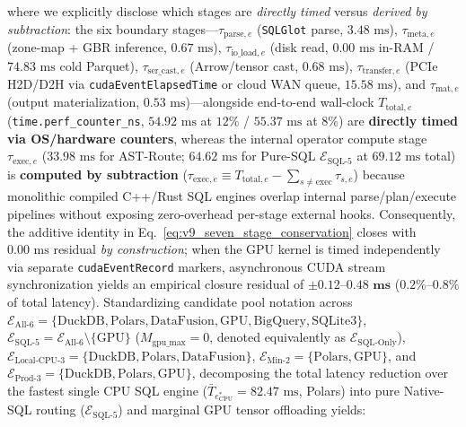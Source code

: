 \documentclass[10pt,a4paper]{article}
\begin{document}
\begin{enumerate}[leftmargin=1.5em,itemsep=0.8pt]
    where we explicitly disclose which stages are \emph{directly timed} versus \emph{derived by subtraction}: the six boundary stages---$\tau_{\text{parse},e}$ (\texttt{SQLGlot} parse, $3.48\text{ ms}$), $\tau_{\text{meta},e}$ (zone-map + GBR inference, $0.67\text{ ms}$), $\tau_{\text{io\_load},e}$ (disk read, $0.00\text{ ms}$ in-RAM / $74.83\text{ ms}$ cold Parquet), $\tau_{\text{ser\_cast},e}$ (Arrow/tensor cast, $0.68\text{ ms}$), $\tau_{\text{transfer},e}$ (PCIe H2D/D2H via \texttt{cudaEventElapsedTime} or cloud WAN queue, $15.58\text{ ms}$), and $\tau_{\text{mat},e}$ (output materialization, $0.53\text{ ms}$)---alongside end-to-end wall-clock $T_{\text{total},e}$ (\texttt{time.perf\_\allowbreak{}counter\_\allowbreak{}ns}, $54.92\text{ ms}$ at $12\%$ / $55.37\text{ ms}$ at $8\%$) are \textbf{directly timed via OS/hardware counters}, whereas the internal operator compute stage $\tau_{\text{exec},e}$ ($33.98\text{ ms}$ for AST-Route; $64.62\text{ ms}$ for Pure-SQL $\mathcal{E}_{\text{SQL-5}}$ at $69.12\text{ ms}$ total) is \textbf{computed by subtraction} ($\tau_{\text{exec},e} \equiv T_{\text{total},e} - \sum_{s\neq\text{exec}}\tau_{s,e}$) because monolithic compiled C++/Rust SQL engines overlap internal parse/plan/execute pipelines without exposing zero-overhead per-stage external hooks. Consequently, the additive identity in Eq.~\eqref{eq:v9_seven_stage_conservation} closes with $0.00\text{ ms}$ residual \emph{by construction}; when the GPU kernel is timed independently via separate \texttt{cudaEventRecord} markers, asynchronous CUDA stream synchronization yields an empirical closure residual of $\mathbf{\pm 0.12\text{--}0.48\text{ ms}}$ ($\mathbf{0.2\%\text{--}0.8\%}$ of total latency). Standardizing candidate pool notation across $\mathcal{E}_{\text{All-6}} = \{\text{DuckDB},\text{Polars},\text{DataFusion},\text{GPU},\text{BigQuery},\text{SQLite3}\}$, $\mathcal{E}_{\text{SQL-5}} = \mathcal{E}_{\text{All-6}}\setminus\{\text{GPU}\}$ ($M_{\text{gpu\_max}}=0$, denoted equivalently as $\mathcal{E}_{\text{SQL-Only}}$), $\mathcal{E}_{\text{Local-CPU-3}} = \{\text{DuckDB},\text{Polars},\text{DataFusion}\}$, $\mathcal{E}_{\text{Min-2}} = \{\text{Polars},\text{GPU}\}$, and $\mathcal{E}_{\text{Prod-3}} = \{\text{DuckDB},\text{Polars},\text{GPU}\}$, decomposing the total latency reduction over the fastest single CPU SQL engine ($\bar{T}_{e^*_{\text{CPU}}} = 82.47\text{ ms}$, Polars) into pure Native-SQL routing ($\mathcal{E}_{\text{SQL-5}}$) and marginal GPU tensor offloading yields:
    \begin{equation}\label{eq:v9_sql_vs_tensor_attribution}

\end{equation}
\end{enumerate}
\end{document}
